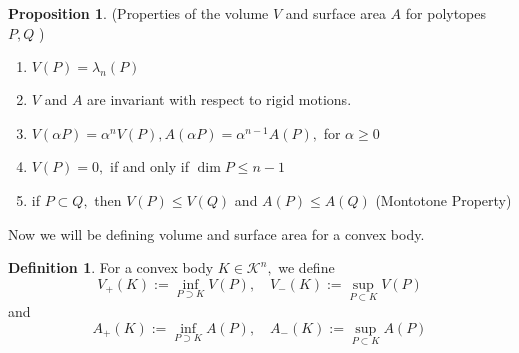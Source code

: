 \documentclass[oneside]{book}
\theoremstyle{definition}
\newtheorem{mydef}{Definition}[chapter]
\newtheorem{prop}{Proposition}
\begin{document}
\begin{prop} \label{prop:1}
(Properties of the volume $V$ and surface area $A$ for polytopes $P, Q$ )
 \begin{enumerate}
 \item  $V(P)=\lambda_{n}(P)$
 \item  $V$ and $A$ are invariant with respect to rigid motions.
 \item $V(\alpha P)=\alpha^{n} V(P), A(\alpha P)=\alpha^{n-1} A(P),$ for $\alpha \geq 0$
 \item $V(P)=0,$ if and only if $\operatorname{dim} P \leq n-1$
 \item  if $P \subset Q,$ then $V(P) \leq V(Q)$ and $A(P) \leq A(Q)$    (Montotone Property)   \label{prop:5}
 \end{enumerate}
  \end{prop}
 
Now we will be defining volume and surface area for a convex body.\\
 \begin{mydef}
  For a convex body $K \in \mathcal{K}^{n},$ we define
$$ V_{+}(K):=\inf _{P \supset K} V(P), \quad V_{-}(K):=\sup _{P \subset K} V(P)$$ 
and
$$ A_{+}(K):=\inf _{P \supset K} A(P), \quad A_{-}(K):=\sup _{P \subset K} A(P) $$ 
 \end{mydef}
 
\end{document}
